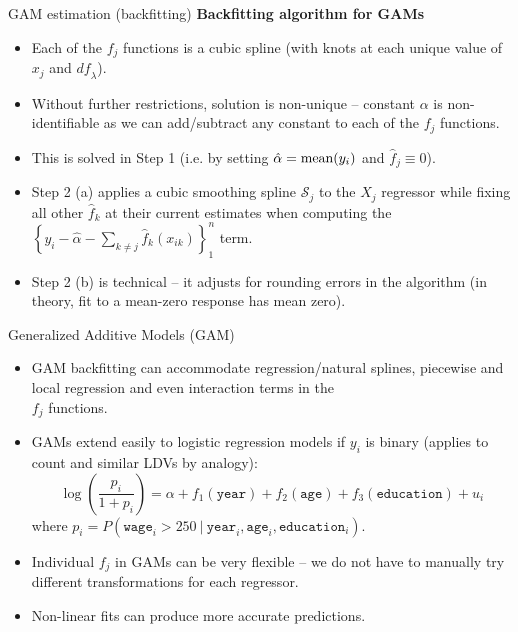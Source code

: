 \documentclass{beamer}
\begin{document}
\begin{frame}{GAM estimation (backfitting)}
\textbf{Backfitting algorithm for GAMs}\\ \medskip
\begin{itemize}
    \item Each of the $f_j$ functions is a cubic spline (with knots at each unique value of $x_j$ and $\textit{df}_{\lambda}$).
    \smallskip
    \item Without further restrictions, solution is non-unique -- constant $\alpha$ is non-identifiable as we can add/subtract any constant to each of the $f_j$ functions.
    \smallskip
    \item This is solved in Step 1 (i.e. by setting $\hat{\alpha} = \textnormal{mean}(y_i)$ and $\hat{f}_j \equiv 0 $).
    \smallskip
    \item Step 2 (a) applies a cubic smoothing spline $\mathcal{S}_j$ to the $X_j$ regressor while fixing all other $\hat{f}_k$ at their current estimates when computing the $\left\lbrace y_i - \hat{\alpha} - \sum_{k \neq j} \hat{f}_k (x_{ik}) \right\rbrace_1^n$ term.
    \smallskip
    \item Step 2 (b) is technical -- it adjusts for rounding errors in the algorithm (in theory, fit to a mean-zero response has mean zero).
\end{itemize}
\end{frame}
\begin{frame}{Generalized Additive Models (GAM)}
\begin{itemize}
    \item[\ding{51}] GAM backfitting can accommodate regression/natural splines, piecewise and local regression and even interaction terms in the \\$f_j$ functions.
    \bigskip
    \item[\ding{51}] GAMs extend easily to logistic regression models if $y_i$ is binary (applies to count and similar LDVs by analogy):
    $$ \log \left( \frac{p_i}{1+p_i}
    \right) = \alpha + f_1(\texttt{year}) + f_2(\texttt{age}) + f_3(\texttt{education}) + u_i$$
where $p_i = P(\texttt{wage}_i > 250~|~ \texttt{year}_i, \texttt{age}_i, \texttt{education}_i)$.
\bigskip
\item[\ding{51}] Individual $f_j$ in GAMs can be very flexible -- we do not have to manually try different transformations for each regressor.
\bigskip
\item[\ding{51}] Non-linear fits can produce more accurate predictions.
\end{itemize}
\end{frame}
\end{document}

